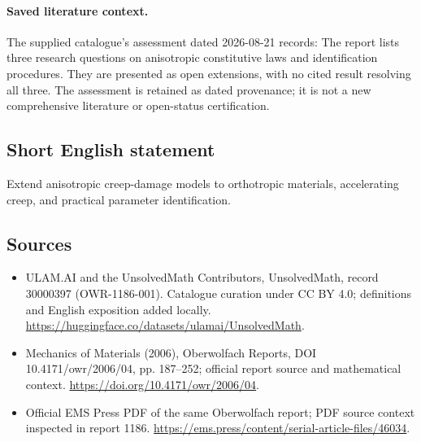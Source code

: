\documentclass[11pt]{article}
\begin{document}
\paragraph{Saved literature context.} The supplied catalogue's assessment dated 2026-08-21 records: The report lists three research questions on anisotropic constitutive laws and identification procedures. They are presented as open extensions, with no cited result resolving all three. The assessment is retained as dated provenance; it is not a new comprehensive literature or open-status certification.
\subsection{Short English statement}
Extend anisotropic creep-damage models to orthotropic materials, accelerating creep, and practical parameter identification.
\subsection{Sources}
\begin{itemize}
\item[\hypertarget{source:30000397:1}{S1}] ULAM.AI and the UnsolvedMath Contributors, UnsolvedMath, record 30000397 (OWR-1186-001). Catalogue curation under CC BY 4.0; definitions and English exposition added locally.
\url{https://huggingface.co/datasets/ulamai/UnsolvedMath}.
\item[\hypertarget{source:30000397:2}{S2}] Mechanics of Materials (2006), Oberwolfach Reports, DOI 10.4171/owr/2006/04, pp. 187--252; official report source and mathematical context.
\url{https://doi.org/10.4171/owr/2006/04}.
\item[\hypertarget{source:30000397:3}{S3}] Official EMS Press PDF of the same Oberwolfach report; PDF source context inspected in report 1186.
\url{https://ems.press/content/serial-article-files/46034}.
\end{itemize}
\label{end:30000397}
\end{document}
